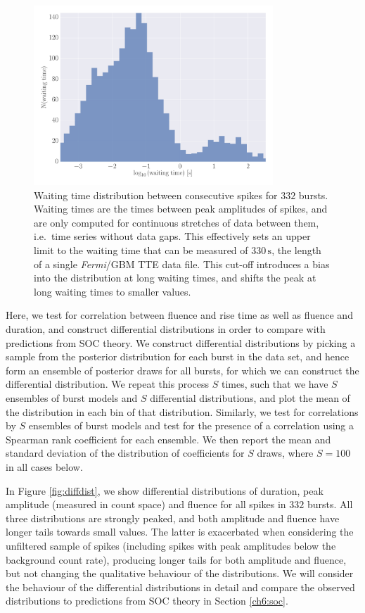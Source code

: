 \documentclass[12pt]{emulateapj}
\newcommand{\project}[1]{\textsl{#1}}
\newcommand{\fermi}{\project{Fermi}}
\begin{document}
  \begin{figure}[htbp]
\begin{center}
\includegraphics[width=9cm]{f6.pdf}%
\caption{Waiting time distribution between consecutive spikes for $332$ bursts. Waiting times are the times between peak amplitudes of spikes, and are only computed for
continuous stretches of data between them, i.e.\ time series without data gaps. This effectively sets an upper limit to the waiting time that can be measured of $330\,\mathrm{s}$, the 
length of a single \fermi/GBM TTE data file. This cut-off introduces a bias into the distribution at long waiting times, and shifts the peak at long waiting times to smaller values.}
\label{fig:waitingtimes}
\end{center}
\end{figure}


 Here, we test for correlation between fluence and rise time as well as fluence and duration, and construct differential distributions
 in order to compare with predictions from SOC theory. We construct differential distributions by picking a sample from the posterior distribution
 for each burst in the data set, and hence form an ensemble of posterior draws for all bursts, for which we can construct the differential distribution.
 We repeat this process $S$ times, such that we have $S$ ensembles of burst models and $S$ differential distributions, and plot the mean of the distribution in
 each bin of that distribution. 
 Similarly, we test for correlations by $S$ ensembles of burst models and test for the presence of a correlation using a Spearman rank
 coefficient for each ensemble. We then report the mean and standard deviation of the distribution of coefficients for $S$ draws, where $S = 100$ in all cases below.


 In Figure \ref{fig:diffdist}, we show differential distributions of duration, peak amplitude (measured in count space) and fluence for all spikes in $332$ bursts. All three distributions are
 strongly peaked, and both amplitude and fluence have longer tails towards small values. The latter is exacerbated when considering the unfiltered sample of 
 spikes (including spikes with peak amplitudes below the background count rate), producing longer tails for both amplitude and fluence, but not changing the qualitative behaviour of the distributions. We will consider the behaviour of
 the differential distributions in detail and compare the observed distributions to predictions from SOC theory in Section \ref{ch6:soc}.
\end{document}

